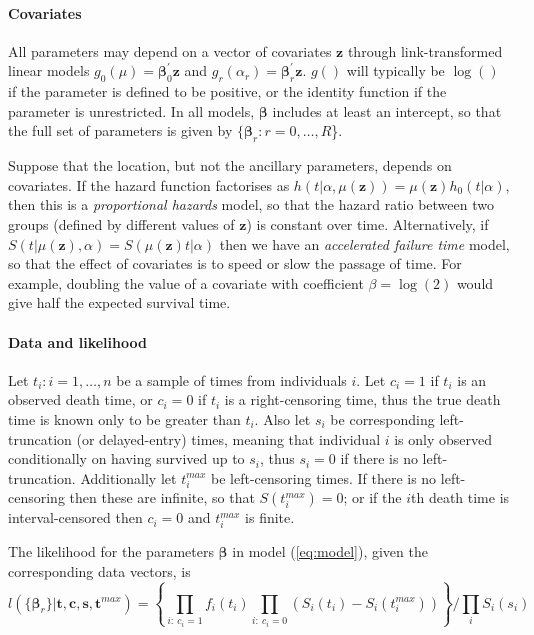 \documentclass[nojss,nofooter]{jss}
\begin{document}

\paragraph{Covariates} 

All parameters may depend on a vector of covariates $\mathbf{z}$
through link-transformed linear models $g_0(\mu) = \bm{\beta}_0^{'}
\mathbf{z}$ and $g_r(\alpha_r) = \bm{\beta}_r^{'} \mathbf{z}$. $g()$
will typically be $\log()$ if the parameter is defined to be positive,
or the identity function if the parameter is unrestricted.  In all
models, $\bm{\beta}$ includes at least an intercept, so that the full
set of parameters is given by $\{\bm{\beta}_r: r=0,\ldots,R$\}.

Suppose that the location, but not the ancillary parameters, depends
on covariates.  If the hazard function factorises as $h(t | \alpha,
\mu(\mathbf{z})) = \mu(\mathbf{z}) h_0(t | \alpha)$, then this is a
\emph{proportional hazards} model, so that the hazard ratio between
two groups (defined by different values of $\mathbf{z}$) is constant
over time.  Alternatively, if $S(t | \mu(\mathbf{z}), \alpha) =
S(\mu(\mathbf{z}) t | \alpha)$ then we have an \emph{accelerated
  failure time} model, so that the effect of covariates is to speed or
slow the passage of time. For example, doubling the value of a
covariate with coefficient $\beta=\log(2)$ would give half the
expected survival time.


\paragraph{Data and likelihood} 

Let $t_i: i=1,\ldots, n$ be a sample of times from individuals $i$.
Let $c_i=1$ if $t_i$ is an observed death time, or $c_i=0$ if $t_i$ is
a right-censoring time, thus the true death time is known only to be
greater than $t_i$.  Also let $s_i$ be corresponding left-truncation
(or delayed-entry) times, meaning that individual $i$ is only observed
conditionally on having survived up to $s_i$, thus $s_i=0$ if there is
no left-truncation.  Additionally let $t^{max}_i$ be left-censoring
times.  If there is no left-censoring then these are infinite, so that
$S(t^{max}_i)=0$; or if the $i$th death time is interval-censored then
$c_i=0$ and $t^{max}_i$ is finite.

The likelihood for the parameters $\bm{\beta}$ in model
(\ref{eq:model}), given the corresponding data vectors, is
\begin{equation}
  \label{eq:lik}
  l(\{\bm{\beta}_r\} | \mathbf{t},\mathbf{c},\mathbf{s},\mathbf{t}^{max}) = \left\{ \prod_{i:\ c_i=1} f_i(t_i) \prod_{i:\ c_i=0} \left(S_i(t_i) - S_i(t^{max}_i)\right)\right\} / \prod_i S_i(s_i)  
\end{equation}
\end{document}
